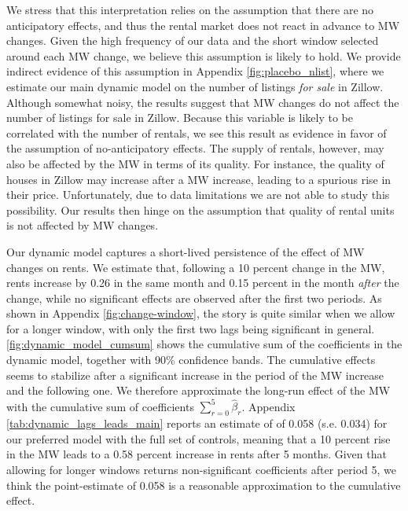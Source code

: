 We stress that this interpretation relies on the assumption that there are no anticipatory
effects, and thus the rental market does not react in advance to MW changes. Given the high 
frequency of our data and the short window selected around each MW change, we believe this 
assumption is likely to hold. We provide indirect evidence of this assumption in Appendix 
\autoref{fig:placebo_nlist}, where we estimate our main dynamic model on the number of listings 
\textit{for sale} in Zillow. Although somewhat noisy, the results suggest that MW changes do 
not affect the number of listings for sale in Zillow. Because this variable is likely to be 
correlated with the number of rentals, we see this result as evidence in favor of the 
assumption of no-anticipatory effects. The supply of rentals, however, may also be affected 
by the MW in terms of its quality. For instance, the quality of houses in Zillow may increase 
after a MW increase, leading to a spurious rise in their price. Unfortunately, due to data 
limitations we are not able to study this possibility. Our results then hinge on the assumption 
that quality of rental units is not affected by MW changes.

Our dynamic model captures a short-lived persistence of the effect of MW changes on rents. We 
estimate that, following a 10 percent change in the MW, rents increase by 0.26 in the same month 
and 0.15 percent in the month \textit{after} the change, while no significant effects are 
observed after the first two periods. As shown in Appendix \autoref{fig:change-window}, the 
story is quite similar when we allow for a longer window, with only the first two lags being 
significant in general.
\autoref{fig:dynamic_model_cumsum} shows the cumulative sum of the coefficients in the dynamic 
model, together with 90\% confidence bands. The cumulative effects seems to stabilize after a 
significant increase in the period of the MW increase and the following one. We therefore 
approximate the long-run effect of the MW with the cumulative sum of coefficients 
$\sum_{r=0}^{5} \hat{\beta}_{r}$. Appendix \autoref{tab:dynamic_lags_leads_main} reports an 
estimate of of 0.058 (s.e. 0.034) for our preferred model with the full set of controls, 
meaning that a 10 percent rise in the MW leads to a 0.58 percent increase in rents after 5 
months. Given that allowing for longer windows returns non-significant coefficients after period 
5, we think the point-estimate of 0.058 is a reasonable approximation to the cumulative effect.

